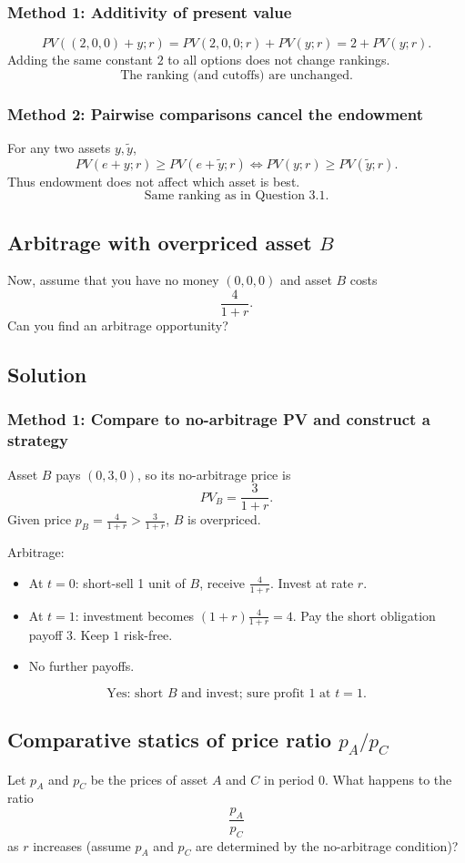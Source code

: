 \documentclass[12pt]{article}
\begin{document}
\subsubsection*{Method 1: Additivity of present value}
\[
PV((2,0,0)+y;r)=PV(2,0,0;r)+PV(y;r)=2+PV(y;r).
\]
Adding the same constant \(2\) to all options does not change rankings.
\[
\boxed{\;\text{The ranking (and cutoffs) are unchanged.}\;}
\]

\subsubsection*{Method 2: Pairwise comparisons cancel the endowment}
For any two assets \(y,\tilde y\),
\[
PV(e+y;r)\ge PV(e+\tilde y;r)\iff PV(y;r)\ge PV(\tilde y;r).
\]
Thus endowment does not affect which asset is best.
\[
\boxed{\;\text{Same ranking as in Question 3.1.}\;}
\]

\subsection{Arbitrage with overpriced asset \(B\)}
Now, assume that you have no money \((0,0,0)\) and asset \(B\) costs
\[
\frac{4}{1+r}.
\]
Can you find an arbitrage opportunity?

\subsection*{Solution}
\subsubsection*{Method 1: Compare to no-arbitrage PV and construct a strategy}
Asset \(B\) pays \((0,3,0)\), so its no-arbitrage price is
\[
PV_B=\frac{3}{1+r}.
\]
Given price \(p_B=\frac{4}{1+r}>\frac{3}{1+r}\), \(B\) is overpriced.

Arbitrage:
\begin{itemize}[leftmargin=*]
\item At \(t=0\): short-sell 1 unit of \(B\), receive \(\frac{4}{1+r}\). Invest at rate \(r\).
\item At \(t=1\): investment becomes \((1+r)\frac{4}{1+r}=4\). Pay the short obligation payoff \(3\). Keep \(1\) risk-free.
\item No further payoffs.
\end{itemize}
\[
\boxed{\;\text{Yes: short }B\text{ and invest; sure profit }1\text{ at }t=1.\;}
\]

\subsection{Comparative statics of price ratio \(p_A/p_C\)}
Let \(p_A\) and \(p_C\) be the prices of asset \(A\) and \(C\) in period 0. What happens to the ratio
\[
\frac{p_A}{p_C}
\]
as \(r\) increases (assume \(p_A\) and \(p_C\) are determined by the no-arbitrage condition)?
\end{document}
